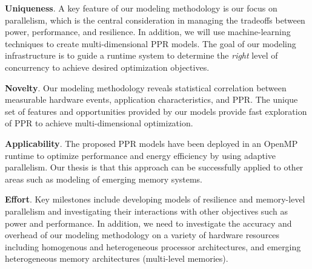 \documentclass{article}  %
\begin{document}
\noindent\textbf{Uniqueness}.
A key feature of our modeling methodology is our focus on
parallelism, which is the central consideration in managing the tradeoffs
between power, performance, and resilience. In addition, we will use
machine-learning techniques to create multi-dimensional PPR models.
The goal of our modeling infrastructure is to guide a runtime system 
to determine the \emph{right} level of concurrency to achieve desired 
optimization objectives. 


\noindent\textbf{Novelty}. 
Our modeling methodology reveals statistical correlation
between measurable hardware events, application characteristics, and 
PPR. The unique set of features and opportunities provided by our models
provide fast exploration of PPR to achieve multi-dimensional optimization.     

\noindent\textbf{Applicability}. 
The proposed PPR models have been deployed in an OpenMP runtime to
optimize performance and energy efficiency by using adaptive
parallelism. Our thesis is that this approach can be successfully applied
to other areas such as modeling of emerging memory systems. 


\noindent\textbf{Effort}. 
Key milestones include developing models of resilience and memory-level 
parallelism and investigating their interactions with other 
objectives such as power and performance. In addition, we need to
investigate the accuracy and overhead of our modeling methodology on a
variety of hardware  resources including homogenous and heterogeneous
processor architectures, and emerging heterogeneous memory architectures
(multi-level memories). 




\end{document}
